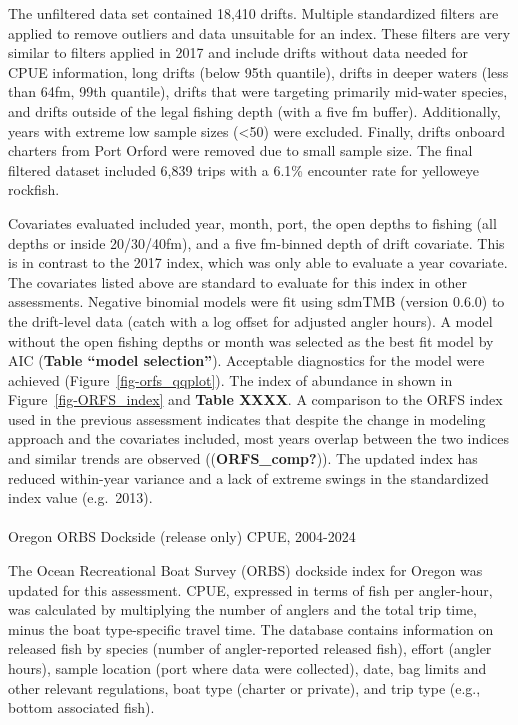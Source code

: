 \documentclass[
]{scrartcl}
\makeatletter
\let\oldparagraph\paragraph
\renewcommand{\paragraph}{
    \@ifstar
      \xxxParagraphStar
      \xxxParagraphNoStar
  }
\newcommand{\xxxParagraphStar}[1]{\oldparagraph*{#1}\mbox{}}
\newcommand{\xxxParagraphNoStar}[1]{\oldparagraph{#1}\mbox{}}
\makeatother
\begin{document}
The unfiltered data set contained 18,410 drifts. Multiple standardized
filters are applied to remove outliers and data unsuitable for an index.
These filters are very similar to filters applied in 2017 and include
drifts without data needed for CPUE information, long drifts (below 95th
quantile), drifts in deeper waters (less than 64fm, 99th quantile),
drifts that were targeting primarily mid-water species, and drifts
outside of the legal fishing depth (with a five fm buffer).
Additionally, years with extreme low sample sizes (\textless50) were
excluded. Finally, drifts onboard charters from Port Orford were removed
due to small sample size. The final filtered dataset included 6,839
trips with a 6.1\% encounter rate for yelloweye rockfish.

Covariates evaluated included year, month, port, the open depths to
fishing (all depths or inside 20/30/40fm), and a five fm-binned depth of
drift covariate. This is in contrast to the 2017 index, which was only
able to evaluate a year covariate. The covariates listed above are
standard to evaluate for this index in other assessments. Negative
binomial models were fit using sdmTMB (version 0.6.0) to the drift-level
data (catch with a log offset for adjusted angler hours). A model
without the open fishing depths or month was selected as the best fit
model by AIC (\textbf{Table ``model selection''}). Acceptable
diagnostics for the model were achieved (Figure~\ref{fig-orfs_qqplot}).
The index of abundance in shown in Figure~\ref{fig-ORFS_index} and
\textbf{Table XXXX}. A comparison to the ORFS index used in the previous
assessment indicates that despite the change in modeling approach and
the covariates included, most years overlap between the two indices and
similar trends are observed ((\textbf{ORFS\_comp?})). The updated index
has reduced within-year variance and a lack of extreme swings in the
standardized index value (e.g.~2013).

\paragraph{Oregon ORBS Dockside (release only) CPUE,
2004-2024}\label{oregon-orbs-dockside-release-only-cpue-2004-2024}

The Ocean Recreational Boat Survey (ORBS) dockside index for Oregon was
updated for this assessment. CPUE, expressed in terms of fish per
angler-hour, was calculated by multiplying the number of anglers and the
total trip time, minus the boat type-specific travel time. The database
contains information on released fish by species (number of
angler-reported released fish), effort (angler hours), sample location
(port where data were collected), date, bag limits and other relevant
regulations, boat type (charter or private), and trip type (e.g., bottom
associated fish).
\end{document}

